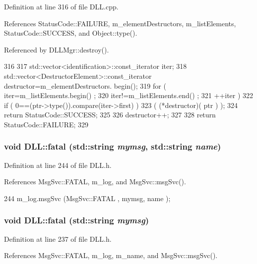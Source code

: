 Definition at line 316 of file DLL.cpp.

References StatusCode::FAILURE, m\_\-elementDestructors, m\_\-listElements, StatusCode::SUCCESS, and Object::type().

Referenced by DLLMgr::destroy().


\begin{DoxyCode}
316                                        {
317   std::vector<identification>::const_iterator iter;
318   std::vector<DestructorElement>::const_iterator destructor=m_elementDestructors.
      begin();
319   for ( iter=m_listElements.begin() ;
320         iter!=m_listElements.end() ;
321         ++iter ) {
322     if ( 0==(ptr->type()).compare(iter->first) ){
323       ( (*destructor)( ptr ) );
324       return StatusCode::SUCCESS;
325     }
326     destructor++;
327   }
328   return StatusCode::FAILURE;
329 }
\end{DoxyCode}
\hypertarget{classDLL_ada1bec81505d4e419e995004a2eb180e}{
\subsubsection[{fatal}]{\setlength{\rightskip}{0pt plus 5cm}void DLL::fatal (std::string {\em mymsg}, \/  std::string {\em name})}}
\label{classDLL_ada1bec81505d4e419e995004a2eb180e}


Definition at line 244 of file DLL.h.

References MsgSvc::FATAL, m\_\-log, and MsgSvc::msgSvc().


\begin{DoxyCode}
244 { m_log.msgSvc (MsgSvc::FATAL   , mymsg, name ); }
\end{DoxyCode}
\hypertarget{classDLL_a946b5d7e4b0b200b7acf190aa58bf9c4}{
\subsubsection[{fatal}]{\setlength{\rightskip}{0pt plus 5cm}void DLL::fatal (std::string {\em mymsg})}}
\label{classDLL_a946b5d7e4b0b200b7acf190aa58bf9c4}


Definition at line 237 of file DLL.h.

References MsgSvc::FATAL, m\_\-log, m\_\-name, and MsgSvc::msgSvc().


